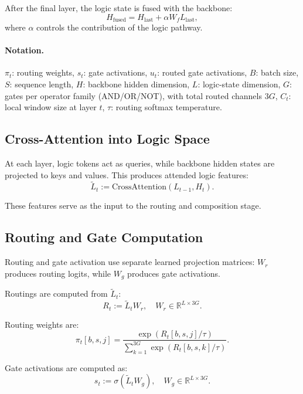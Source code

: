 \documentclass[10pt,twocolumn,letterpaper]{article}
\begin{document}
After the final layer, the logic state is fused with the backbone:
\begin{equation}
H_{\text{fused}} = H_{\text{last}} + \alpha W_f L_{\text{last}},
\label{eq:fusion}
\end{equation}
where $\alpha$ controls the contribution of the logic pathway.

\paragraph{Notation.}
$\pi_t$: routing weights, $s_t$: gate activations, $u_t$: routed gate activations,
$B$: batch size, $S$: sequence length, $H$: backbone hidden dimension,
$L$: logic-state dimension, $G$: gates per operator family (AND/OR/NOT), with
total routed channels $3G$, $C_t$: local window size at layer $t$,
$\tau$: routing softmax temperature.

\subsection{Cross-Attention into Logic Space}

At each layer, logic tokens act as queries, while backbone hidden states are projected
to keys and values. This produces attended logic features:
\begin{equation}
\tilde{L}_t := \text{CrossAttention}(L_{t-1}, H_t).
\end{equation}

These features serve as the input to the routing and composition stage.

\subsection{Routing and Gate Computation}

Routing and gate activation use separate learned projection matrices: $W_r$
produces routing logits, while $W_g$ produces gate activations.

Routings are computed from $\tilde{L}_t$:
\begin{equation}
R_t := \tilde{L}_t W_r, \quad W_r \in \mathbb{R}^{L \times 3G}.
\end{equation}

Routing weights are:
\begin{equation}
\pi_t[b,s,j] = \frac{\exp(R_t[b,s,j]/\tau)}{\sum_{k=1}^{3G} \exp(R_t[b,s,k]/\tau)}.
\end{equation}

Gate activations are computed as:
\begin{equation}
s_t := \sigma(\tilde{L}_t W_g), \quad W_g \in \mathbb{R}^{L \times 3G}.
\end{equation}
\end{document}
